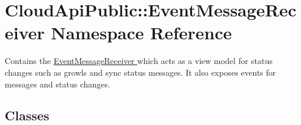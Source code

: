 \hypertarget{namespace_cloud_api_public_1_1_event_message_receiver}{\section{Cloud\-Api\-Public\-:\-:Event\-Message\-Receiver Namespace Reference}
\label{namespace_cloud_api_public_1_1_event_message_receiver}
}


Contains the \hyperlink{class_cloud_api_public_1_1_event_message_receiver_1_1_event_message_receiver}{Event\-Message\-Receiver } which acts as a view model for status changes such as growls and sync status messages. It also exposes events for messages and status changes.  


\subsection*{Classes}
